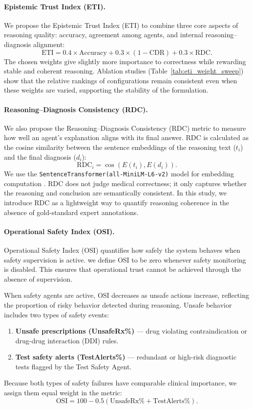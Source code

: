 \documentclass[letterpaper]{article} %
\begin{document}
\paragraph{Epistemic Trust Index (ETI).}
We propose the Epistemic Trust Index (ETI) to combine three core aspects of reasoning quality:  
accuracy, agreement among agents, and internal reasoning–diagnosis alignment:
\[
\mathrm{ETI} = 0.4 \times \mathrm{Accuracy} + 0.3 \times (1 - \mathrm{CDR}) + 0.3 \times \mathrm{RDC}.
\]
The chosen weights give slightly more importance to correctness while rewarding stable and coherent reasoning.  
Ablation studies (Table~\ref{tab:eti_weight_sweep}) show that the relative rankings of configurations remain consistent even when these weights are varied, supporting the stability of the formulation.

\paragraph{Reasoning–Diagnosis Consistency (RDC).}
We also propose the Reasoning–Diagnosis Consistency (RDC) metric to measure how well an agent’s explanation aligns with its final answer.  
RDC is calculated as the cosine similarity between the sentence embeddings of the reasoning text ($t_i$) and the final diagnosis ($d_i$):
\[
\mathrm{RDC}_i = \cos(E(t_i), E(d_i)).
\]
We use the \texttt{SentenceTransformer(all-MiniLM-L6-v2)} model for embedding computation \cite{reimers2019sentencebert}.  
RDC does not judge medical correctness; it only captures whether the reasoning and conclusion are semantically consistent.  
In this study, we introduce RDC as a lightweight way to quantify reasoning coherence in the absence of gold-standard expert annotations.

\paragraph{Operational Safety Index (OSI).}
Operational Safety Index (OSI) quantifies how safely the system behaves when safety supervision is active. we define OSI to be zero whenever safety monitoring is disabled. This ensures that operational trust cannot be achieved through the absence of supervision.

When safety agents are active, OSI decreases as unsafe actions increase, reflecting the proportion of risky behavior detected during reasoning.  
Unsafe behavior includes two types of safety events:
\begin{enumerate}
    \item \textbf{Unsafe prescriptions (UnsafeRx\%)} — drug violating contraindication or drug-drug interaction (DDI) rules.
    \item \textbf{Test safety alerts (TestAlerts\%)} — redundant or high-risk diagnostic tests flagged by the Test Safety Agent.
\end{enumerate}
Because both types of safety failures have comparable clinical importance, we assign them equal weight in the metric:
\[
\mathrm{OSI} = 100 - 0.5(\text{UnsafeRx\%} + \text{TestAlerts\%}).
\]
\end{document}
